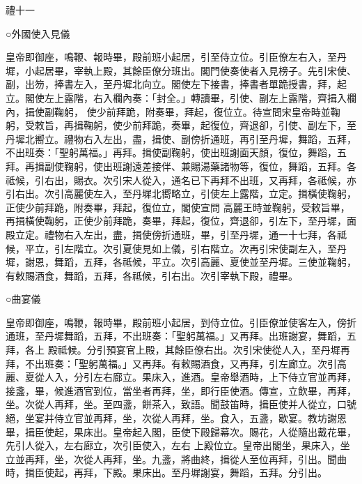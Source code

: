 
\begin{pinyinscope}

 禮十一



 ○外國使入見儀



 皇帝即御座，鳴鞭、報時畢，殿前班小起居，引至侍立位。引臣僚左右入，至丹墀，小起居畢，宰執上殿，其餘臣僚分班出。閣門使奏使者入見榜子。先引宋使、副，出笏，捧書左入，至丹墀北向立。閣使左下接書，捧書者單跪授書，拜，起立。閣使左上露階，右入欄內奏：「封全。」轉讀畢，引使、副左上露階，齊揖入欄內，揖使副鞠躬，
 使少前拜跪，附奏畢，拜起，復位立。待宣問宋皇帝時並鞠躬，受敕旨，再揖鞠躬，使少前拜跪，奏畢，起復位，齊退卻，引使、副左下，至丹墀北嚮立。禮物右入左出，盡，揖使、副傍折通班，再引至丹墀，舞蹈，五拜，不出班奏：「聖躬萬福。」再拜。揖使副鞠躬，使出班謝面天顏，復位，舞蹈，五拜。再揖副使鞠躬，使出班謝遠差接伴、兼賜湯藥諸物等，復位，舞蹈，五拜。各祗候，引右出，賜衣。次引宋人從入，通名已下再拜不出班，又再拜，各祗候，亦引右出。次引高麗使左入，至丹墀北嚮略立，引使左上露階，立定。揖橫使鞠躬，正使少前拜跪，附奏畢，拜起，復位立，閣使宣問
 高麗王時並鞠躬，受敕旨畢，再揖橫使鞠躬，正使少前拜跪，奏畢，拜起，復位，齊退卻，引左下，至丹墀，面殿立定。禮物右入左出，盡，揖使傍折通班，畢，引至丹墀，通一十七拜，各祗候，平立，引左階立。次引夏使見如上儀，引右階立。次再引宋使副左入，至丹墀，謝恩，舞蹈，五拜，各祗候，平立。次引高麗、夏使並至丹墀。三使並鞠躬，有敕賜酒食，舞蹈，五拜，各祗候，引右出。次引宰執下殿，禮畢。



 ○曲宴儀



 皇帝即御座，鳴鞭，報時畢，殿前班小起居，到侍立位。引臣僚並使客左入，傍折通班，至丹墀舞蹈，五拜，不出班奏：「聖躬萬福。」又再拜。出班謝宴，舞蹈，五拜，各上
 殿祗候。分引預宴官上殿，其餘臣僚右出。次引宋使從人入，至丹墀再拜，不出班奏：「聖躬萬福。」又再拜。有敕賜酒食，又再拜，引左廊立。次引高麗、夏從人入，分引左右廊立。果床入，進酒。皇帝舉酒時，上下侍立官並再拜，接盞，畢，候進酒官到位，當坐者再拜，坐，即行臣使酒。傳宣，立飲畢，再拜，坐。次從人再拜，坐。至四盞，餅茶入，致語。聞鼓笛時，揖臣使并人從立，口號絕，坐宴并侍立官並再拜，坐，次從人再拜，坐。食入，五盞，歇宴。教坊謝恩畢，揖臣使起，果床出。皇帝起入閣，臣使下殿歸幕次。賜花，人從隨出戴花畢，先引人從入，左右廊立，次引臣使入，左右
 上殿位立。皇帝出閣坐，果床入，坐立並再拜，坐，次從人再拜，坐。九盞，將曲終，揖從人至位再拜，引出。聞曲時，揖臣使起，再拜，下殿。果床出。至丹墀謝宴，舞蹈，五拜。分引出。




\end{pinyinscope}
